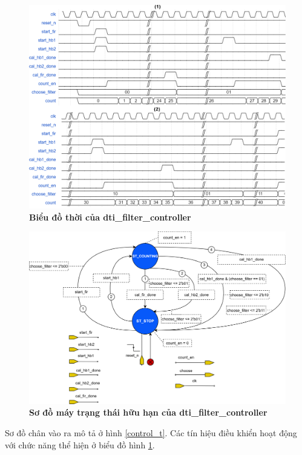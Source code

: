 \begin{figure}[H]
    \centering
    \includegraphics[width=13cm]{Images/Chuong4/hb_fir/control-timing.png}
    \caption[Biểu đồ thời của dti\_filter\_controller]{\bfseries \fontsize{12pt}{0pt}\selectfont Biểu đồ thời  của dti\_filter\_controller}
    \label{control_timing}
\end{figure}
\begin{figure}[H]
    \centering
    \includegraphics[width=14cm]{Images/Chuong4/hb_fir/control-fsm.png}
    \caption[Sơ đồ máy trạng thái hữu hạn của dti\_filter\_controller]{\bfseries \fontsize{12pt}{0pt}\selectfont Sơ đồ máy trạng thái hữu hạn của dti\_filter\_controller}
    \label{control_fsm}
\end{figure}
Sơ đồ chân vào ra mô tả ở hình \ref{control_t}. Các tín hiệu điều khiển hoạt động với chức năng thể hiện ở biểu đồ hình \ref{control_timing}.

